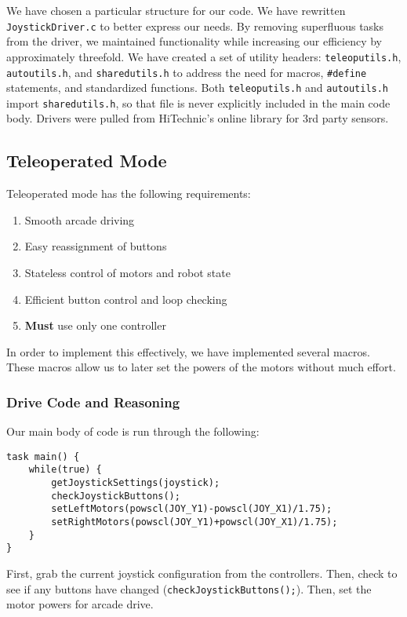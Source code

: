 \documentclass{article}
\begin{document}
We have chosen a particular structure for our code. We have rewritten \lstinline{JoystickDriver.c}{} to better express our needs. By removing superfluous tasks from the driver, we maintained functionality while increasing our efficiency by approximately threefold. We have created a set of utility headers: \lstinline{teleoputils.h}{}, \lstinline{autoutils.h}{}, and \lstinline{sharedutils.h}{} to address the need for macros, \lstinline{#define}{} statements, and standardized functions. Both \lstinline{teleoputils.h}{} and \lstinline{autoutils.h}{} import \lstinline{sharedutils.h}{}, so that file is never explicitly included in the main code body. Drivers were pulled from HiTechnic's online library for 3rd party sensors.

\subsection{Teleoperated Mode}

Teleoperated mode has the following requirements: \begin{enumerate}
	\item{Smooth arcade driving}
	\item{Easy reassignment of buttons}
	\item{Stateless control of motors and robot state}
	\item{Efficient button control and loop checking}
	\item{\textbf{Must} use only one controller}
\end{enumerate}

In order to implement this effectively, we have implemented several macros. These macros allow us to later set the powers of the motors without much effort. 

\subsubsection{Drive Code and Reasoning}

Our main body of code is run through the following:

\begin{lstlisting}[tabsize=4]
task main() {
	while(true) {
		getJoystickSettings(joystick);
		checkJoystickButtons();
		setLeftMotors(powscl(JOY_Y1)-powscl(JOY_X1)/1.75);
		setRightMotors(powscl(JOY_Y1)+powscl(JOY_X1)/1.75);
	}
}
\end{lstlisting}

First, grab the current joystick configuration from the controllers. Then, check to see if any buttons have changed (\lstinline{checkJoystickButtons();}{}). Then, set the motor powers for arcade drive. 
\end{document}
